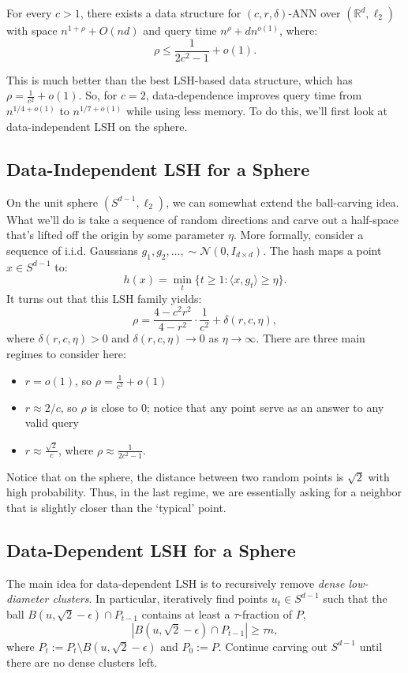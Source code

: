 \begin{theorem}
For every $c > 1$, there exists a data structure for $(c,r,\delta)$-ANN over $(\mathbb{R}^d, \ell_2)$ with space $n ^{1 + \rho} + O(nd)$ and query time $n^\rho + dn^{o(1)}$, where:
\[\rho \leq \frac{1}{2c^2 - 1} + o(1).\]
\end{theorem}

This is much better than the best LSH-based data structure, which has $\rho = \frac{1}{c^2} + o(1)$. So, for $c = 2$, data-dependence improves query time from $n^{1/4 + o(1)}$ to $n^{1/7 + o(1)}$ while using less memory. To do this, we'll first look at data-independent LSH on the sphere.

\subsection{Data-Independent LSH for a Sphere}
On the unit sphere $(S^{d-1},\ell_2)$, we can somewhat extend the ball-carving idea. What we'll do is take a sequence of random directions and carve out a half-space that's lifted off the origin by some parameter $\eta$. More formally, consider a sequence of i.i.d. Gaussians $g_1, g_2, \dotsc, \sim \mathcal{N}(0, I_{d \times d})$. The hash maps a point $x \in S^{d -1}$ to:
\[h(x) = \min_t \{t \geq 1 : \langle x, g_t\rangle \geq \eta\}.\]
It turns out that this LSH family yields:
\[\rho = \frac{4 - c^2 r^2}{4 - r^2} \cdot \frac{1}{c^2} + \delta(r,c,\eta),\]
where $\delta(r,c,\eta) > 0$ and $\delta (r,c,\eta) \to 0$ as $\eta \to \infty$. There are three main regimes to consider here:
\begin{itemize}
    \item $r = o(1)$, so $\rho = \frac{1}{c^2} + o(1)$
    \item $r \approx 2/c$, so $\rho$ is close to 0; notice that any point serve as an answer to any valid query
    \item $r \approx \frac{\sqrt{2}}{c}$, where $\rho \approx \frac{1}{2c^2 - 1}$.
\end{itemize}

Notice that on the sphere, the distance between two random points is $\sqrt{2}$ with high probability. Thus, in the last regime, we are essentially asking for a neighbor that is slightly closer than the `typical' point.

\subsection{Data-Dependent LSH for a Sphere}
The main idea for data-dependent LSH is to recursively remove \emph{dense low-diameter clusters}. In particular, iteratively find points $u_t \in S^{d-1}$ such that the ball $B(u, \sqrt{2} - \epsilon) \cap P_{t-1}$ contains at least a $\tau$-fraction of $P$,
\[|B(u,\sqrt{2} - \epsilon) \cap P_{t-1} | \geq \tau n,\]
where $P_t := P_t \setminus B(u,\sqrt{2} - \epsilon)$ and $P_0 := P$. Continue carving out $S^{d-1}$ until there are no dense clusters left.


